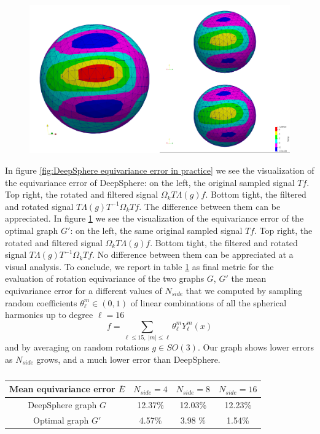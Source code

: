 \begin{figure}[h!]
	\centering
	\includegraphics[width=\textwidth]{../codes/06.Equivariance_error/img_example_thresholdedHKGL/thresholdedHKGL.png}	
	\caption{\label{fig:Optimal equivariance error in practice}}
\end{figure}

In figure \ref{fig:DeepSphere equivariance error in practice} we see the visualization of the equivariance error of DeepSphere: on the left, the original sampled signal $Tf$. Top right, the rotated and filtered signal $\Omega_k T \Lambda(g) f$. Bottom tight, the filtered and rotated signal $T \Lambda(g) T^{-1} \Omega_k T f $. The difference between them can be appreciated. In figure \ref{fig:Optimal equivariance error in practice} we see the visualization of the equivariance error of the optimal graph $G'$: on the left, the same original sampled signal $Tf$. Top right, the rotated and filtered signal $\Omega_k T \Lambda(g) f$. Bottom tight, the filtered and rotated signal $T \Lambda(g) T^{-1} \Omega_k T f $. No difference between them can be appreciated at a visual analysis.
To conclude, we report in table \ref{tab:final results} as final metric for the evaluation of rotation equivariance of the two graphs $G$, $G'$ the mean equivariance error for a different values of $N_{side}$ that we computed by sampling random coefficients $\theta_\ell^m \in(0,1)$ of linear combinations of all the spherical harmonics up to degree $\ell=16$
$$f = \sum_{\ell\leq 15,\ |m|\leq\ell}\theta_\ell^m Y_\ell^m(x)
$$
and by averaging on random rotations $g\in SO(3)$. Our graph shows lower errors as $N_{side}$ grows, and a much lower error than DeepSphere.

\begin{table}
		\centering
\begin{tabular}{c|ccc}
	Mean equivariance error $\overline{E}$& $N_{side}=4$& $N_{side}=8$&$N_{side}=16$ \\\hline
	DeepSphere graph $G$ & 12.37\% & 12.03\% & 12.23\% \\
	Optimal graph $G'$ & 4.57\% & 3.98 \% & 1.54\%
\end{tabular}
\caption{\label{tab:final results}}
\end{table}

